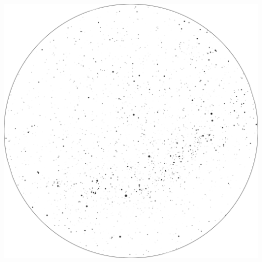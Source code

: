 \documentclass{./SAS-class-skygen}
\begin{document}
	\vspace{0.5cm}
    \begin{center}
    \includegraphics[width=\textwidth]{./pics/skychart46.png}
    \end{center}
    
    
\end{document}
